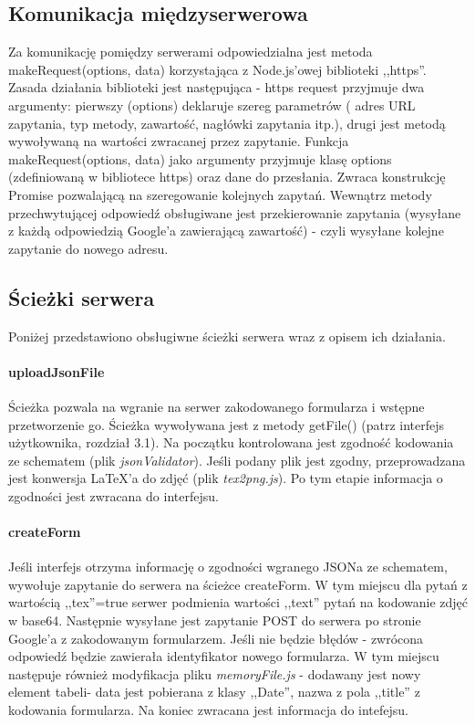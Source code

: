 \subsection{Komunikacja międzyserwerowa}
Za komunikację pomiędzy serwerami odpowiedzialna jest metoda makeRequest(options, data) korzystająca z Node.js'owej biblioteki ,,https''. Zasada działania biblioteki jest następująca - https request przyjmuje dwa argumenty: pierwszy (options) deklaruje szereg parametrów ( adres URL zapytania, typ metody, zawartość, nagłówki zapytania itp.), drugi jest metodą wywoływaną na wartości zwracanej przez zapytanie. 
\ind Funkcja makeRequest(options, data) jako argumenty przyjmuje klasę options (zdefiniowaną w bibliotece https) oraz dane do przesłania. Zwraca konstrukcję Promise pozwalającą na szeregowanie kolejnych zapytań. Wewnątrz metody przechwytującej odpowiedź obsługiwane jest przekierowanie zapytania (wysyłane z każdą odpowiedzią Google'a zawierającą zawartość) - czyli wysyłane kolejne zapytanie do nowego adresu.
\subsection{Ścieżki serwera}
Poniżej przedstawiono obsługiwne ścieżki serwera wraz z opisem ich działania.
\paragraph{uploadJsonFile} Ścieżka pozwala na wgranie na serwer zakodowanego formularza i wstępne przetworzenie go. Ścieżka wywoływana jest z metody getFile() (patrz interfejs użytkownika, rozdział 3.1). Na początku kontrolowana jest zgodność kodowania ze schematem (plik \textit{jsonValidator}). Jeśli podany plik jest zgodny, przeprowadzana jest konwersja \LaTeX{}'a do zdjęć (plik \textit{tex2png.js}). Po tym etapie informacja o zgodności jest zwracana do interfejsu.
\paragraph{createForm} Jeśli interfejs otrzyma informację o zgodności wgranego JSONa ze schematem, wywołuje zapytanie do serwera na ścieżce createForm. W tym miejscu dla pytań z wartością ,,tex''=true serwer podmienia wartości ,,text'' pytań na kodowanie zdjęć w base64. Następnie wysyłane jest zapytanie POST do serwera po stronie Google'a z zakodowanym formularzem. Jeśli nie będzie błędów - zwrócona odpowiedź będzie zawierała identyfikator nowego formularza. W tym miejscu następuje również modyfikacja pliku \textit{memoryFile.js} - dodawany jest nowy element tabeli- data jest pobierana z klasy ,,Date'', nazwa z pola ,,title'' z kodowania formularza. Na koniec zwracana jest informacja do intefejsu.
